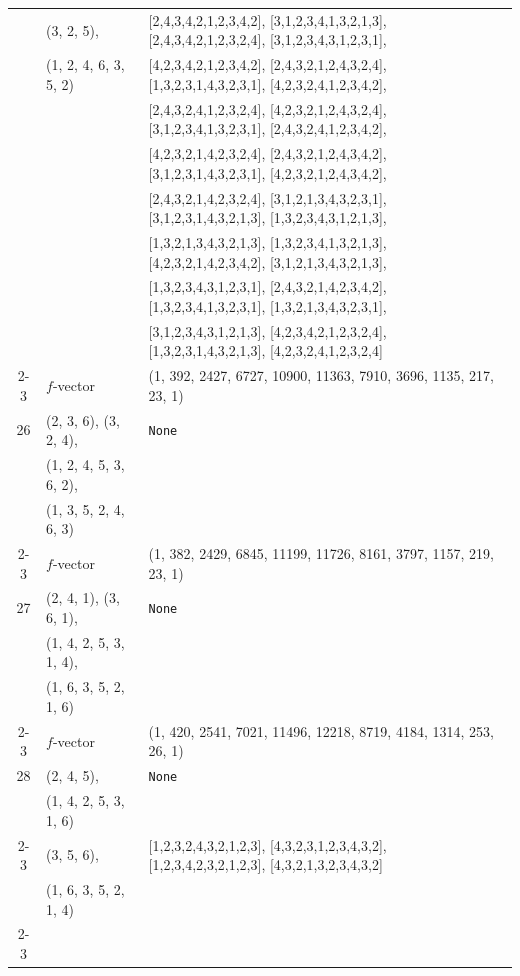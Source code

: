 \documentclass[10pt]{amsart}
\numberwithin{equation}{section}
\theoremstyle{plain}
\theoremstyle{definition}
\theoremstyle{remark}
\begin{document}
{\begin{longtable}{c|l|l}
		& (3, 2, 5), & [2,4,3,4,2,1,2,3,4,2], [3,1,2,3,4,1,3,2,1,3], [2,4,3,4,2,1,2,3,2,4], [3,1,2,3,4,3,1,2,3,1], \\
		& (1, 2, 4, 6, 3, 5, 2) & [4,2,3,4,2,1,2,3,4,2], [2,4,3,2,1,2,4,3,2,4], [1,3,2,3,1,4,3,2,3,1], [4,2,3,2,4,1,2,3,4,2], \\
		&  & [2,4,3,2,4,1,2,3,2,4], [4,2,3,2,1,2,4,3,2,4], [3,1,2,3,4,1,3,2,3,1], [2,4,3,2,4,1,2,3,4,2], \\
		&  & [4,2,3,2,1,4,2,3,2,4], [2,4,3,2,1,2,4,3,4,2], [3,1,2,3,1,4,3,2,3,1], [4,2,3,2,1,2,4,3,4,2], \\
		&  & [2,4,3,2,1,4,2,3,2,4], [3,1,2,1,3,4,3,2,3,1], [3,1,2,3,1,4,3,2,1,3], [1,3,2,3,4,3,1,2,1,3], \\
		&  & [1,3,2,1,3,4,3,2,1,3], [1,3,2,3,4,1,3,2,1,3], [4,2,3,2,1,4,2,3,4,2], [3,1,2,1,3,4,3,2,1,3], \\
		&  & [1,3,2,3,4,3,1,2,3,1], [2,4,3,2,1,4,2,3,4,2], [1,3,2,3,4,1,3,2,3,1], [1,3,2,1,3,4,3,2,3,1], \\
		&  & [3,1,2,3,4,3,1,2,1,3], [4,2,3,4,2,1,2,3,2,4], [1,3,2,3,1,4,3,2,1,3], [4,2,3,2,4,1,2,3,2,4] \\ \cline{2-3}
		
		& $f$-vector & {(1, 392, 2427, 6727, 10900, 11363, 7910, 3696, 1135, 217, 23, 1)} \\
		\midrule
		
		26 & (2, 3, 6), (3, 2, 4), & \texttt{None} \\
		& (1, 2, 4, 5, 3, 6, 2), &  \\
		& (1, 3, 5, 2, 4, 6, 3) &  \\ \cline{2-3}
		
		& $f$-vector & {(1, 382, 2429, 6845, 11199, 11726, 8161, 3797, 1157, 219, 23, 1)} \\
		\midrule
		
		27 & (2, 4, 1), (3, 6, 1), & \texttt{None} \\
		& (1, 4, 2, 5, 3, 1, 4), &  \\
		& (1, 6, 3, 5, 2, 1, 6) &  \\ \cline{2-3}
		
		& $f$-vector & {(1, 420, 2541, 7021, 11496, 12218, 8719, 4184, 1314, 253, 26, 1)} \\
		\midrule
		
		28 & (2, 4, 5), & \texttt{None} \\
		& (1, 4, 2, 5, 3, 1, 6) &  \\ \cline{2-3}
		
		& (3, 5, 6), & [1,2,3,2,4,3,2,1,2,3], [4,3,2,3,1,2,3,4,3,2], [1,2,3,4,2,3,2,1,2,3], [4,3,2,1,3,2,3,4,3,2] \\
		& (1, 6, 3, 5, 2, 1, 4) &  \\ \cline{2-3}
		

\end{longtable}}
\end{document}
